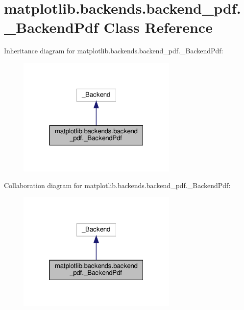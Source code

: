 \hypertarget{classmatplotlib_1_1backends_1_1backend__pdf_1_1__BackendPdf}{}\section{matplotlib.\+backends.\+backend\+\_\+pdf.\+\_\+\+Backend\+Pdf Class Reference}
\label{classmatplotlib_1_1backends_1_1backend__pdf_1_1__BackendPdf}


Inheritance diagram for matplotlib.\+backends.\+backend\+\_\+pdf.\+\_\+\+Backend\+Pdf\+:
\nopagebreak
\begin{figure}[H]
\begin{center}
\leavevmode
\includegraphics[width=223pt]{classmatplotlib_1_1backends_1_1backend__pdf_1_1__BackendPdf__inherit__graph}
\end{center}
\end{figure}


Collaboration diagram for matplotlib.\+backends.\+backend\+\_\+pdf.\+\_\+\+Backend\+Pdf\+:
\nopagebreak
\begin{figure}[H]
\begin{center}
\leavevmode
\includegraphics[width=223pt]{classmatplotlib_1_1backends_1_1backend__pdf_1_1__BackendPdf__coll__graph}
\end{center}
\end{figure}
